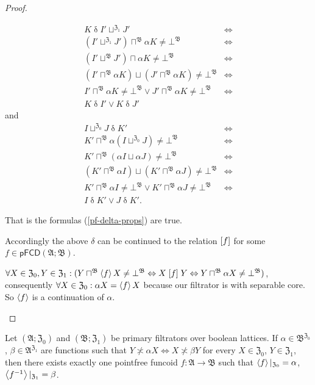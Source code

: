 \begin{proof}
\begin{widedisorder}
\begin{align*}
K\mathrel{\delta}I'\sqcup^{\mathfrak{Z}_{1}}J' & \Leftrightarrow\\
(I'\sqcup^{\mathfrak{Z}_{1}}J')\sqcap^{\mathfrak{B}}\alpha K\neq\bot^{\mathfrak{B}} & \Leftrightarrow\\
(I'\sqcup^{\mathfrak{B}}J')\sqcap\alpha K\neq\bot^{\mathfrak{B}} & \Leftrightarrow\\
(I'\sqcap^{\mathfrak{B}}\alpha K)\sqcup(J'\sqcap^{\mathfrak{B}}\alpha K)\neq\bot^{\mathfrak{B}} & \Leftrightarrow\\
I'\sqcap^{\mathfrak{B}}\alpha K\neq\bot^{\mathfrak{B}}\vee J'\sqcap^{\mathfrak{B}}\alpha K\neq\bot^{\mathfrak{B}} & \Leftrightarrow\\
K\mathrel{\delta}I'\vee K\mathrel{\delta}J'
\end{align*}
and
\begin{align*}
I\sqcup^{\mathfrak{Z}_{0}}J\mathrel{\delta}K' & \Leftrightarrow\\
K'\sqcap^{\mathfrak{B}}\alpha(I\sqcup^{\mathfrak{Z}_{0}}J)\neq\bot^{\mathfrak{B}} & \Leftrightarrow\\
K'\sqcap^{\mathfrak{B}}(\alpha I\sqcup\alpha J)\neq\bot^{\mathfrak{B}} & \Leftrightarrow\\
(K'\sqcap^{\mathfrak{B}}\alpha I)\sqcup(K'\sqcap^{\mathfrak{B}}\alpha J)\neq\bot^{\mathfrak{B}} & \Leftrightarrow\\
K'\sqcap^{\mathfrak{B}}\alpha I\neq\bot^{\mathfrak{B}}\vee K'\sqcap^{\mathfrak{B}}\alpha J\neq\bot^{\mathfrak{B}} & \Leftrightarrow\\
I\mathrel{\delta}K'\vee J\mathrel{\delta}K'.
\end{align*}



That is the formulas (\ref{pf-delta-props}) are true.


Accordingly the above $\delta$ can be continued to the relation $\mathrel{\left[f\right]}$
for some $f\in\mathsf{pFCD}(\mathfrak{A};\mathfrak{B})$.


$\forall X\in\mathfrak{Z}_{0},Y\in\mathfrak{Z}_{1}:(Y\sqcap^{\mathfrak{B}}\left\langle f\right\rangle X\neq\bot^{\mathfrak{B}}\Leftrightarrow X\mathrel{\left[f\right]}Y\Leftrightarrow Y\sqcap^{\mathfrak{B}}\alpha X\neq\bot^{\mathfrak{B}})$,
consequently $\forall X\in\mathfrak{Z}_{0}:\alpha X=\left\langle f\right\rangle X$ because
our filtrator is with separable core. So $\left\langle f\right\rangle$ is a continuation
of $\alpha$.

\end{widedisorder}
\end{proof}
\begin{thm}
Let $(\mathfrak{A};\mathfrak{Z}_{0})$ and $(\mathfrak{B};\mathfrak{Z}_{1})$
be primary filtrators over boolean lattices. If $\alpha\in\mathfrak{B}^{\mathfrak{Z}_{0}}$,
$\beta\in\mathfrak{A}^{\mathfrak{Z}_{1}}$ are functions such that
$Y\nasymp\alpha X\Leftrightarrow X\nasymp\beta Y$ for every $X\in\mathfrak{Z}_{0}$,
$Y\in\mathfrak{Z}_{1}$, then there exists exactly one pointfree funcoid $f:\mathfrak{A}\rightarrow\mathfrak{B}$
such that $\left\langle f\right\rangle|_{\mathfrak{Z}_0}=\alpha$, $\left\langle f^{-1}\right\rangle|_{\mathfrak{Z}_1}=\beta$.\end{thm}
